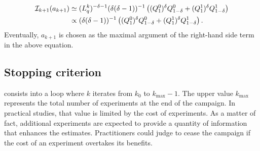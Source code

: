     \begin{align}
        \cI_{k+1}(a_{k+1})&\simeq (L^k_q)^{-\delta-1}  %
        (\delta(\delta-1))^{-1} \left((Q^0_1)^{\delta} Q^0_{1-\delta} + (Q^1_1)^{\delta} Q^1_{1-\delta}\right)\\
        &\propto (\delta(\delta-1))^{-1} \left((Q^0_1)^{\delta} Q^0_{1-\delta} + (Q^1_1)^{\delta} Q^1_{1-\delta}\right).\nonumber
    \end{align}
Eventually, $a_{k+1}$ is chosen as the maximal argument of the right-hand side term in the above equation.





    


\subsection{{Stopping} criterion \label{sec:doe:stopping_crit}}

 consists into a loop where $k$ iterates from $k_0$ to $k_{\max}-1$. The upper value $k_{\max}$ represents the total number of experiments at the end of the campaign. 
In practical studies, that value is limited by the cost of experiments.
%
As a matter of fact, additional experiments are expected to provide a quantity of information that enhances the estimates. %
Practitioners could judge to cease the campaign if the cost of an experiment overtakes its benefits.

